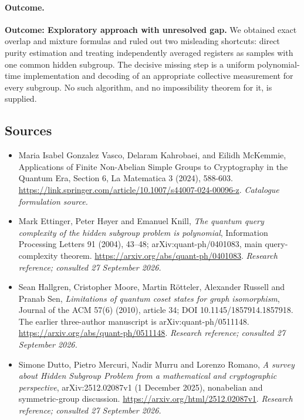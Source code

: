 \documentclass[11pt,a4paper]{article}
\numberwithin{equation}{section}
\begin{document}
\paragraph{Outcome.}
\textbf{Outcome: Exploratory approach with unresolved gap.}
We obtained exact overlap and mixture formulas and ruled out two misleading shortcuts: direct purity estimation and treating independently averaged registers as samples with one common hidden subgroup. The decisive missing step is a uniform polynomial-time implementation and decoding of an appropriate collective measurement for every subgroup. No such algorithm, and no impossibility theorem for it, is supplied.

\subsection{Sources}
\begin{itemize}\raggedright
\item[\textnormal{[S1]}]\hypertarget{source:statement:1}{} Maria Isabel Gonzalez Vasco, Delaram Kahrobaei, and Eilidh McKemmie, Applications of Finite Non-Abelian Simple Groups to Cryptography in the Quantum Era, Section 6, La Matematica 3 (2024), 588-603.
\url{https://link.springer.com/article/10.1007/s44007-024-00096-z}.
{\small\textit{Catalogue formulation source.}}
\item[\textnormal{[E1]}]\hypertarget{extra:statement:1}{} Mark Ettinger, Peter H\o yer and Emanuel Knill, \emph{The quantum query complexity of the hidden subgroup problem is polynomial}, Information Processing Letters 91 (2004), 43--48; arXiv:quant-ph/0401083, main query-complexity theorem.
\url{https://arxiv.org/abs/quant-ph/0401083}.
{\small\textit{Research reference; consulted 27 September 2026.}}
\item[\textnormal{[E2]}]\hypertarget{extra:statement:2}{} Sean Hallgren, Cristopher Moore, Martin R\"otteler, Alexander Russell and Pranab Sen, \emph{Limitations of quantum coset states for graph isomorphism}, Journal of the ACM 57(6) (2010), article 34; DOI 10.1145/1857914.1857918. The earlier three-author manuscript is arXiv:quant-ph/0511148.
\url{https://arxiv.org/abs/quant-ph/0511148}.
{\small\textit{Research reference; consulted 27 September 2026.}}
\item[\textnormal{[E3]}]\hypertarget{extra:statement:3}{} Simone Dutto, Pietro Mercuri, Nadir Murru and Lorenzo Romano, \emph{A survey about Hidden Subgroup Problem from a mathematical and cryptographic perspective}, arXiv:2512.02087v1 (1 December 2025), nonabelian and symmetric-group discussion.
\url{https://arxiv.org/html/2512.02087v1}.
{\small\textit{Research reference; consulted 27 September 2026.}}
\end{itemize}
\end{document}
